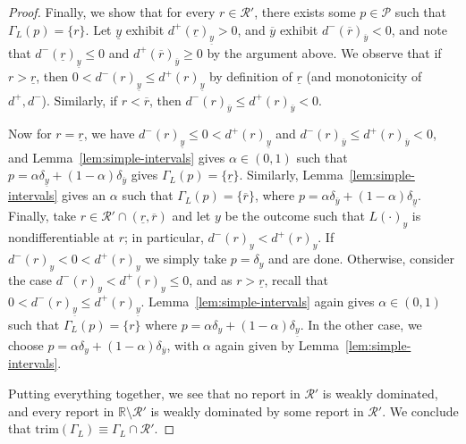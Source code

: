 \documentclass[11pt]{article}
\newcommand{\Comments}{1}
\newcommand{\mytodo}[2]{\ifnum\Comments=1%
  \todo[linecolor=#1!80!black,backgroundcolor=#1,bordercolor=#1!80!black]{#2}\fi}
\newcommand{\raft}[1]{\mytodo{green!20!white}{RF: #1}}
\newcommand{\reals}{\mathbb{R}}
\renewcommand{\P}{\mathcal{P}}
\newcommand{\R}{\mathcal{R}}
\newcommand{\trim}{\mathrm{trim}}
\begin{document}
\begin{proof}

  Finally, we show that for every $r\in \R'$, there exists some $p\in\P$ such that $\Gamma_L(p) = \{r\}$.
  Let $\underline y$ exhibit $d^+(\underline r)_{\underline y} > 0$, and $\overline y$ exhibit $d^-(\overline r)_{\overline y} < 0$, and note that $d^-(\underline r)_{\underline y} \leq 0$ and $d^+(\overline r)_{\overline y} \geq 0$ by the argument above.
  We observe that if $r > \underline r$, then $0 < d^-(r)_{\underline y} \leq d^+(r)_{\underline y}$ by definition of $\underline r$ (and monotonicity of $d^+,d^-$).
  Similarly, if $r < \overline r$, then $d^-(r)_{\overline y} \leq d^+(r)_{\overline y} < 0$.

  Now for $r = \underline r$, we have $d^-(r)_{\underline y} \leq 0 < d^+(r)_{\underline y}$ and $d^-(r)_{\overline y} \leq d^+(r)_{\overline y} < 0$, and Lemma~\ref{lem:simple-intervals} gives $\alpha \in (0,1)$ such that $p = \alpha \delta_{\underline y} + (1-\alpha) \delta_{\overline y}$ gives $\Gamma_L(p) = \{\underline r\}$.
  Similarly, Lemma~\ref{lem:simple-intervals} gives an $\alpha$ such that $\Gamma_L(p) = \{\overline r\}$, where $p = \alpha \delta_{\overline y} + (1-\alpha) \delta_{\underline y}$.
  Finally, take $r \in \R' \cap (\underline r, \overline r)$ and let $y$ be the outcome such that $L(\cdot)_y$ is nondifferentiable at $r$; in particular, $d^-(r)_y < d^+(r)_y$.
  If $d^-(r)_y < 0 < d^+(r)_y$ we simply take $p = \delta_y$ and are done.
  Otherwise, consider the case $d^-(r)_y < d^+(r)_y \leq 0$, and as $r > \underline r$, recall that $0 < d^-(r)_{\underline y} \leq d^+(r)_{\underline y}$.
  Lemma~\ref{lem:simple-intervals} again gives $\alpha \in (0,1)$ such that $\Gamma_L(p) = \{r\}$ where $p = \alpha \delta_{y} + (1-\alpha) \delta_{\underline y}$.
  In the other case, we choose $p = \alpha \delta_{y} + (1-\alpha) \delta_{\overline y}$, with $\alpha$ again given by Lemma~\ref{lem:simple-intervals}.
  
  Putting everything together, we see that no report in $\R'$ is weakly dominated, and every report in $\reals\setminus\R'$ is weakly dominated by some report in $\R'$.
  We conclude that $\trim(\Gamma_L) \equiv \Gamma_L \cap \R'$.
\end{proof}
\end{document}
